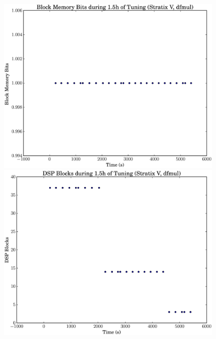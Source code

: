 \documentclass[12pt, a4paper]{article}
\begin{document}
\begin{figure}[htpb]
    \begin{minipage}{.48\textwidth}
        \includegraphics[scale=.25]{dfmul_block_5400_chstone_StratixV}
    \end{minipage}%
    \hfill
    \begin{minipage}{.48\textwidth}
        \includegraphics[scale=.25]{dfmul_dsp_5400_chstone_StratixV}
    \end{minipage}%


\end{figure}
\end{document}

